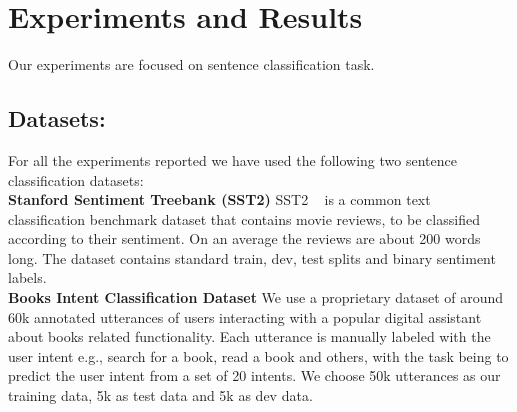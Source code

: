 \section{Experiments and Results}
\label{sec:experiments}
Our experiments are focused on sentence classification task. %
\subsection{Datasets:} %
For all the experiments reported we have used the following two sentence classification datasets:    \\
\textbf{Stanford Sentiment Treebank (SST2)}
SST2 ~\cite{socher2013recursive} is a common text classification benchmark dataset that contains movie reviews, to be classified according to their sentiment. On an average the reviews are about 200 words long. The dataset contains standard train, dev, test splits and binary sentiment labels. \\
\textbf{Books Intent Classification Dataset}
We use a proprietary dataset of around 60k annotated utterances of users interacting with a popular digital assistant about books related functionality. Each utterance is manually labeled with the user intent e.g., search for a book, read a book and others, with the task being to predict the user intent from a set of 20 intents. We choose 50k utterances as our training data, 5k as test data and 5k as dev data.%
